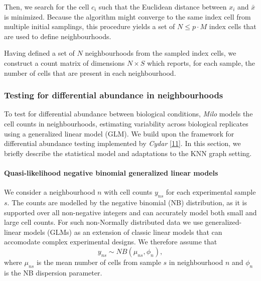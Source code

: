 \documentclass[
]{article}
\begin{document}
Then, we search for the cell \(c_i\) such that the Euclidean distance between \(x_i\) and \(\bar{x}\) is minimized. Because the algorithm might converge to the same index cell from multiple initial samplings, this procedure yields a set of \(N \leq p \cdot M\) index cells that are used to define neighbourhoods.

Having defined a set of \(N\) neighbourhoods from the sampled index cells, we construct a count matrix of dimensions \(N \times S\) which reports, for each sample, the number of cells that are present in each neighbourhood.

\hypertarget{testDA}{%
\subsubsection{Testing for differential abundance in neighbourhoods}\label{testDA}}

To test for differential abundance between biological conditions, \emph{Milo} models the cell counts in neighbourhoods, estimating variability across biological replicates using a generalized linear model (GLM). We build upon the framework for differential abundance testing implemented by \emph{Cydar} {[}\protect\hyperlink{ref-lunTestingDifferentialAbundance2017}{11}{]}. In this section, we briefly describe the statistical model and adaptations to the KNN graph setting.

\hypertarget{quasi-likelihood-negative-binomial-generalized-linear-models}{%
\paragraph*{Quasi-likelihood negative binomial generalized linear models}\label{quasi-likelihood-negative-binomial-generalized-linear-models}}

We consider a neighbourhood \(n\) with cell counts \(y_{ns}\) for each experimental sample \(s\). The counts are modelled by the negative binomial (NB) distribution, as it is supported over all non-negative integers and can accurately model both small and large cell counts. For such non-Normally distributed data we use generalized-linear models (GLMs) as an extension of classic linear models that can accomodate complex experimental designs. We therefore assume that
\[
y_{ns} \sim NB(\mu_{ns},\phi_{n}),
\]
where \(\mu_{ns}\) is the mean number of cells from sample \(s\) in neighbourhood \(n\) and \(\phi_{n}\) is the NB dispersion parameter.
\end{document}
